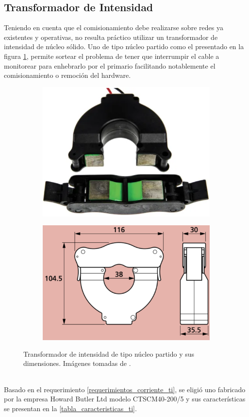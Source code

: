 \subsection{Transformador de Intensidad}
Teniendo en cuenta que el comisionamiento debe realizarse sobre redes ya existentes y operativas, no resulta práctico utilizar un transformador de intensidad de núcleo sólido. Uno de tipo núcleo partido como el presentado en la figura \ref{fig:ti_abierto}, permite sortear el problema de tener que interrumpir el cable a monitorear para enhebrarlo por el primario facilitando notablemente el comisionamiento o remoción del hardware.\\
\begin{figure}[h!]
	\centering
	\begin{subfigure}[b]{0.4\textwidth}
		\centering
		\includegraphics[width=.7\textwidth]{./Figures/ti_abierto}
		\caption{}
		\label{fig:ti_abierto}
	\end{subfigure}
	\centering
	\begin{subfigure}[b]{0.4\textwidth}
		\centering
		\includegraphics[width=.7\textwidth]{./Figures/ti_dimensiones}
		\caption{}
		\label{fig:ti_dimensiones}
	\end{subfigure}
	\caption{Transformador de intensidad de tipo núcleo partido y sus dimensiones. Imágenes tomadas de \citep{ct_hobut}.}
	\label{fig:ti_mosaico}
\end{figure}\\
Basado en el requerimiento \ref{requerimientos_corriente_ti}, se eligió uno fabricado por la empresa Howard Butler Ltd modelo CTSCM40-200/5 y sus características se presentan en la \ref{tabla_caracteristicas_ti}.\\ 

